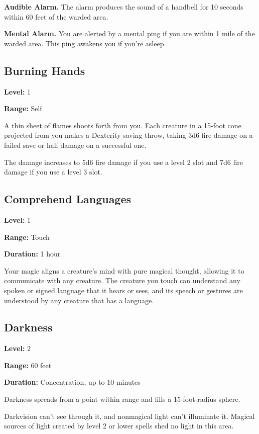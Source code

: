 \documentclass[12pt,letterpaper,twocolumn,openany,nodeprecatedcode,bg=none]{dndbook}
\let\oldsubsection\subsection
\renewcommand{\subsection}[1]{%
  \needspace{5\baselineskip}%
  \oldsubsection{#1}%
}
\begin{document}
\textbf{Audible Alarm.} The alarm produces the sound of a handbell for
10 seconds within 60 feet of the warded area.

\textbf{Mental Alarm.} You are alerted by a mental ping if you are
within 1 mile of the warded area. This ping awakens you if you're
asleep.

\subsection{Burning Hands}\label{burning-hands}

\textbf{Level:} 1

\textbf{Range:} Self

A thin sheet of flames shoots forth from you. Each creature in a 15-foot
cone projected from you makes a Dexterity saving throw, taking 3d6 fire
damage on a failed save or half damage on a successful one.

The damage increases to 5d6 fire damage if you use a level 2 slot and
7d6 fire damage if you use a level 3 slot.

\subsection{Comprehend Languages}\label{comprehend-languages}

\textbf{Level:} 1

\textbf{Range:} Touch

\textbf{Duration:} 1 hour

Your magic aligns a creature's mind with pure magical thought, allowing
it to communicate with any creature. The creature you touch can
understand any spoken or signed language that it hears or sees, and its
speech or gestures are understood by any creature that has a language.

\subsection{Darkness}\label{darkness}

\textbf{Level:} 2

\textbf{Range:} 60 feet

\textbf{Duration:} Concentration, up to 10 minutes

Darkness spreads from a point within range and fills a 15-foot-radius
sphere.

Darkvision can't see through it, and nonmagical light can't illuminate
it. Magical sources of light created by level 2 or lower spells shed no
light in this area.
\end{document}
